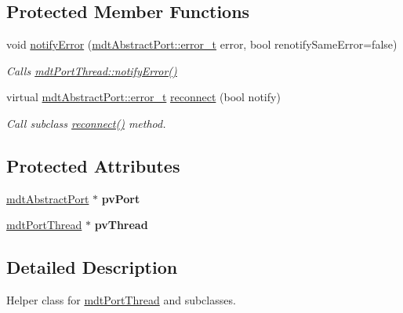 \subsection*{Protected Member Functions}
\begin{DoxyCompactItemize}
\item 
void \hyperlink{classmdt_port_thread_helper_aaa98db16bfcc30d82e9d542fc2a52d6b}{notifyError} (\hyperlink{classmdt_abstract_port_ad4121bb930c95887e77f8bafa065a85e}{mdtAbstractPort::error\_\-t} error, bool renotifySameError=false)
\begin{DoxyCompactList}\small\item\em Calls \hyperlink{classmdt_port_thread_a30bdd11ef16d4f3321921c9d9b26399d}{mdtPortThread::notifyError()} \end{DoxyCompactList}\item 
virtual \hyperlink{classmdt_abstract_port_ad4121bb930c95887e77f8bafa065a85e}{mdtAbstractPort::error\_\-t} \hyperlink{classmdt_port_thread_helper_a1d0874434ae6442610e2bc685be6458f}{reconnect} (bool notify)
\begin{DoxyCompactList}\small\item\em Call subclass \hyperlink{classmdt_port_thread_helper_a1d0874434ae6442610e2bc685be6458f}{reconnect()} method. \end{DoxyCompactList}\end{DoxyCompactItemize}
\subsection*{Protected Attributes}
\begin{DoxyCompactItemize}
\item 
\hypertarget{classmdt_port_thread_helper_ada4497db38cb418c2021aecaf4caa36c}{
\hyperlink{classmdt_abstract_port}{mdtAbstractPort} $\ast$ {\bfseries pvPort}}
\label{classmdt_port_thread_helper_ada4497db38cb418c2021aecaf4caa36c}

\item 
\hypertarget{classmdt_port_thread_helper_a44780de0f664de18ca999ef43321c525}{
\hyperlink{classmdt_port_thread}{mdtPortThread} $\ast$ {\bfseries pvThread}}
\label{classmdt_port_thread_helper_a44780de0f664de18ca999ef43321c525}

\end{DoxyCompactItemize}


\subsection{Detailed Description}
Helper class for \hyperlink{classmdt_port_thread}{mdtPortThread} and subclasses. 

